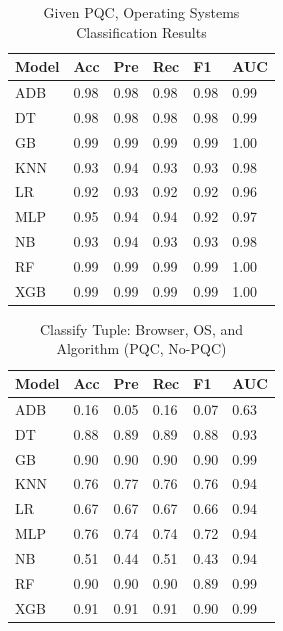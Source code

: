 \documentclass[10pt,journal]{IEEEtran}%
\begin{document}
\begin{table}[!]
\centering
\caption{Given PQC, Operating Systems Classification Results}
\vspace{1.5mm}
\label{tab:os}
\begin{tabular}{|l|l|l|l|l|l|}
\hline
Model               & Acc & Pre & Rec & F1 & AUC  \\ \hline \hline
ADB            & 0.98     & 0.98      & 0.98   & 0.98     & 0.99 \\ \hline
DT      & 0.98     & 0.98      & 0.98   & 0.98     & 0.99 \\ \hline
GB   & 0.99     & 0.99      & 0.99   & 0.99     & 1.00 \\ \hline
KNN                 & 0.93     & 0.94      & 0.93   & 0.93     & 0.98 \\ \hline
LR & 0.92     & 0.93      & 0.92   & 0.92     & 0.96 \\ \hline
MLP                 & 0.95     & 0.94      & 0.94   & 0.92     & 0.97 \\ \hline
NB         & 0.93     & 0.94      & 0.93   & 0.93     & 0.98 \\ \hline
RF       & 0.99     & 0.99      & 0.99   & 0.99     & 1.00 \\ \hline
XGB             & 0.99     & 0.99      & 0.99   & 0.99     & 1.00 \\ \hline
\end{tabular}
\end{table}


\begin{table}[htbp]
\centering
\caption{Classify Tuple: Browser, OS, and Algorithm (PQC, No-PQC)}
\vspace{1.5mm}
\label{tab:all}
\begin{tabular}{|l|l|l|l|l|l|}
\hline
Model               & Acc & Pre & Rec & F1 & AUC  \\ \hline \hline
ADB            & 0.16     & 0.05      & 0.16   & 0.07     & 0.63 \\ \hline
DT       & 0.88     & 0.89      & 0.89   & 0.88     & 0.93 \\ \hline
GB   & 0.90     & 0.90      & 0.90   & 0.90     & 0.99 \\ \hline
KNN                 & 0.76     & 0.77      & 0.76   & 0.76     & 0.94 \\ \hline
LR & 0.67     & 0.67      & 0.67   & 0.66     & 0.94 \\ \hline
MLP                 & 0.76     & 0.74      & 0.74   & 0.72     & 0.94 \\ \hline
NB         & 0.51     & 0.44      & 0.51   & 0.43     & 0.94 \\ \hline
RF       & 0.90     & 0.90      & 0.90   & 0.89     & 0.99 \\ \hline
XGB             & 0.91     & 0.91      & 0.91   & 0.90     & 0.99 \\ \hline
\end{tabular}
\end{table}
\end{document}

